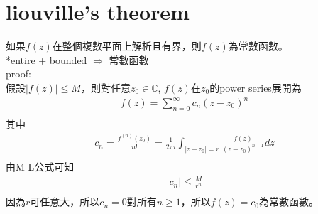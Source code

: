 \documentclass{article}
\begin{document}
\section{liouville's theorem}
如果$f(z)$在整個複數平面上解析且有界，則$f(z)$為常數函數。\\
*entire + bounded $\Rightarrow$ 常數函數\\
proof:\\
假設$|f(z)| \leq M$，則對任意$z_0 \in \mathbb{C}$, $f(z)$在$z_0$的power series展開為
\begin{align*}
    f(z) = \sum_{n=0}^{\infty} c_{n}(z-z_0)^{n} \\  
\end{align*}
其中
\begin{align*}
    c_{n} = \frac{f^{(n)}(z_0)}{n!} = \frac{1}{2\pi i} \int_{|z-z_0|=r} \frac{f(z)}{(z-z_0)^{n+1}} dz \\
\end{align*}
由M-L公式可知
\begin{align*}
    |c_{n}| \leq \frac{M}{r^{n}} \\
\end{align*}
因為$r$可任意大，所以$c_{n} = 0$對所有$n \geq 1$，所以$f(z) = c_0$為常數函數。\\

\end{document}
